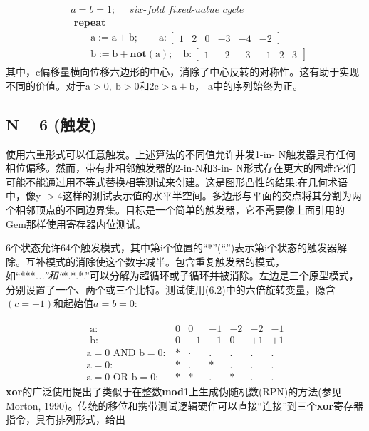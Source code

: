 \begin{CJK}{UTF8}{gbsn}
\begin{align}
\begin{aligned}
& a=b=1 ; \quad \textit { six-fold fixed-ualue cycle } \\
& \textbf { repeat } \\
& \qquad \mathrm{a}:=\mathrm{a}+\mathrm{b} ; \qquad \mathrm{a}:\left[\begin{array}{llllll}1 & 2 & 0 & -3 & -4 & -2\end{array}\right]\\
& \qquad \mathrm{b}:=\mathrm{b}+\textbf{not}(\mathrm{a}) ; \quad \mathrm{b}:\left[\begin{array}{llllll}1 & -2 & -3 & -1 & 2 & 3\end{array}\right]
\end{aligned}
\tag{6.2}
\end{align}
其中，c偏移量横向位移六边形的中心，消除了中心反转的对称性。这有助于实现不同的价值。对于$\mathrm{a}>0, \mathrm{~b}>0$和$2 \mathrm{c}>\mathrm{a}+\mathrm{b}$， $\mathrm{a}$中的序列始终为正。

\subsection*{$\mathbf{N=6}$ (触发)}
使用六重形式可以任意触发。上述算法的不同值允许并发1-in- $\mathrm{N}$触发器具有任何相位偏移。然而，带有非相邻触发器的2-in-N和3-in- $\mathrm{N}$形式存在更大的困难:它们可能不能通过用不等式替换相等测试来创建。这是图形凸性的结果:在几何术语中，像y $>4$这样的测试表示值的水平半空间。多边形与平面的交点将其分割为两个相邻顶点的不同边界集。目标是一个简单的触发器，它不需要像上面引用的Gem那样使用寄存器内位测试。

6个状态允许64个触发模式，其中第i个位置的“*”(“.”)表示第i个状态的触发器解除。互补模式的消除使这个数字减半。包含重复触发器的模式，如“***\textit{...”和“}*.*.*.”可以分解为超循环或子循环并被消除。左边是三个原型模式，分别设置了一个、两个或三个比特。测试使用(6.2)中的六倍旋转变量，隐含$(c=-1)$和起始值$a=b=0$:


\begin{align}
\begin{array}{rlrrrrrr}
\text { a: } & 0 & 0 & -1 & -2 & -2 & -1 \\
\text { b: } & 0 & -1 & -1 & 0 & +1 & +1 \\
\mathrm{a}=0 \text { AND b}= 0:&   * & \cdot & . & . & . & . \\
\mathrm{a}= 0: & * & . & * & . & . & . \\
\mathrm{a}=0 \text { OR } \mathrm{b}=0: & * & * & . & * & . & .
\end{array}
\tag{6.3}
\end{align}
\textbf{xor}的广泛使用提出了类似于在整数\textbf{mod}1上生成伪随机数(RPN)的方法(参见Morton, 1990)。传统的移位和携带测试逻辑硬件可以直接“连接”到三个\textbf{xor}寄存器指令，具有排列形式，给出


\end{CJK}
